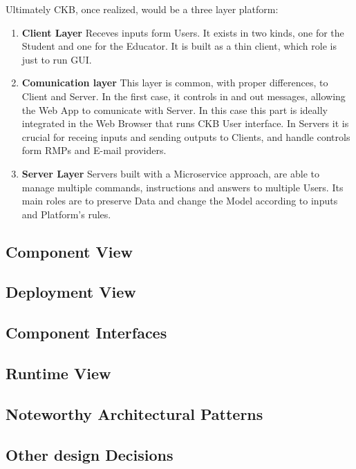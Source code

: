 Ultimately CKB, once realized, would be a three layer platform:
\begin{enumerate}
    \item \textbf{Client Layer} Receves inputs form Users. It exists in two kinds, one for the Student and one for the Educator. It is built as a thin client, which role is just to run GUI.
    \item \textbf{Comunication layer} This layer is common, with proper differences, to Client and Server. In the first case, it controls in and out messages, allowing the Web App to comunicate with Server. In this case this part is ideally integrated in the Web Browser that runs CKB User interface. In Servers it is crucial for receing inputs and sending outputs to Clients, and handle controls form RMPs and E-mail providers.
    \item \textbf{Server Layer} Servers built with a Microservice approach, are able to manage multiple commands, instructions and answers to multiple Users. Its main roles are to preserve Data and change the Model according to inputs and Platform's rules.
\end{enumerate}
\subsection{Component View}
\subsection{Deployment View}
\subsection{Component Interfaces}
\subsection{Runtime View}
\subsection{Noteworthy Architectural Patterns}
\subsection{Other design Decisions}